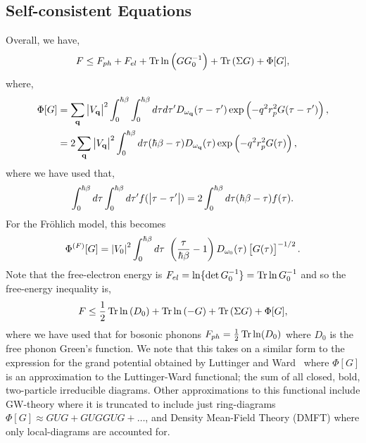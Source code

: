 \subsection{Self-consistent Equations}

Overall, we have,
\begin{equation}
    F \leq F_{ph} + F_{el} + \Tr \ln \left(G G_0^{-1}\right)   + \Tr \left( \Sigma G \right) + \Phi[G],
\end{equation}
where, 
\begin{equation}
    \begin{aligned}
        \Phi[G] &= \sum_{\vb{q}} \abs{V_{\vb{q}}}^2 \int_{0}^{\hbar\beta} \int_0^{\hbar\beta} d\tau d\tau' D_{\omega_{\vb{q}}}(\tau - \tau') \exp \left( -q^2 r_p^2 G(\tau - \tau') \right) ,\\
        &= 2 \sum_{\vb{q}} \abs{V_{\vb{q}}}^2 \int_0^{\hbar\beta}  d\tau (\hbar \beta - \tau) D_{\omega_{\vb{q}}} (\tau) \exp\left(-q^2 r_p^2 G(\tau)\right),
    \end{aligned}
\end{equation}
where we have used that,
\begin{equation}
    \int_0^{\hbar\beta} d\tau \int_0^{\hbar\beta} d\tau' f(\abs{\tau - \tau'}) = 2 \int_0^{\hbar\beta} d\tau (\hbar\beta - \tau) f(\tau).
\end{equation}
For the Fr\"ohlich model, this becomes
\begin{equation}
    \Phi^{(F)}[G] = \abs{V_0}^2 \int^{\hbar\beta}_0 d\tau\ \left(\frac{\tau}{\hbar\beta} - 1 \right) D_{\omega_0}(\tau) \left[G(\tau)\right]^{-1/2} .
\end{equation}
Note that the free-electron energy is $F_{el} = \ln\{\det G_0^{-1}\} = \Tr \ln G_0^{-1}$ and so the free-energy inequality is,
\begin{equation} \label{eqn:scfreeenergy}
    F \leq \frac{1}{2} \Tr \ln \left( D_0 \right) + \Tr \ln \left(-G\right) + \Tr\left(\Sigma G\right) + \Phi[G],
\end{equation}
where we have used that for bosonic phonons $F_{ph} = \frac{1}{2} \Tr \ln (D_0)$ where $D_0$ is the free phonon Green's function. We note that this takes on a similar form to the expression for the grand potential obtained by Luttinger and Ward~\cite{luttinger_ground-state_1960} where $\Phi[G]$ is an approximation to the Luttinger-Ward functional; the sum of all closed, bold, two-particle irreducible diagrams. Other approximations to this functional include GW-theory where it is truncated to include just ring-diagrams $\Phi[G] \approx GUG + GUGGUG + \dots$, and Density Mean-Field Theory (DMFT) where only local-diagrams are accounted for.

